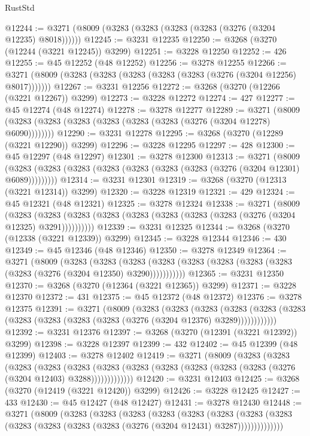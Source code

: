 \begin{lexlean}{RustStd}
\begin{coremodule}
@12244 := @3271 (@8009 (@3283 (@3283 (@3283 (@3283 (@3276 (@3204 @12235) @8018))))))
@12245 := @3231 @12235
@12250 := @3268 (@3270 (@12244 (@3221 @12245)) @3299)
@12251 := @3228 @12250
@12252 := 426
@12255 := @45 @12252 (@48 @12252)
@12256 := @3278 @12255
@12266 := @3271 (@8009 (@3283 (@3283 (@3283 (@3283 (@3283 (@3276 (@3204 @12256) @8017)))))))
@12267 := @3231 @12256
@12272 := @3268 (@3270 (@12266 (@3221 @12267)) @3299)
@12273 := @3228 @12272
@12274 := 427
@12277 := @45 @12274 (@48 @12274)
@12278 := @3278 @12277
@12289 := @3271 (@8009 (@3283 (@3283 (@3283 (@3283 (@3283 (@3283 (@3276 (@3204 @12278) @6090))))))))
@12290 := @3231 @12278
@12295 := @3268 (@3270 (@12289 (@3221 @12290)) @3299)
@12296 := @3228 @12295
@12297 := 428
@12300 := @45 @12297 (@48 @12297)
@12301 := @3278 @12300
@12313 := @3271
    (@8009 (@3283 (@3283 (@3283 (@3283 (@3283 (@3283 (@3283 (@3276 (@3204 @12301) @6089)))))))))
@12314 := @3231 @12301
@12319 := @3268 (@3270 (@12313 (@3221 @12314)) @3299)
@12320 := @3228 @12319
@12321 := 429
@12324 := @45 @12321 (@48 @12321)
@12325 := @3278 @12324
@12338 := @3271
    (@8009
      (@3283 (@3283 (@3283 (@3283 (@3283 (@3283 (@3283 (@3283 (@3276 (@3204 @12325) @3291))))))))))
@12339 := @3231 @12325
@12344 := @3268 (@3270 (@12338 (@3221 @12339)) @3299)
@12345 := @3228 @12344
@12346 := 430
@12349 := @45 @12346 (@48 @12346)
@12350 := @3278 @12349
@12364 := @3271
    (@8009
      (@3283
        (@3283
          (@3283 (@3283 (@3283 (@3283 (@3283 (@3283 (@3283 (@3276 (@3204 @12350) @3290)))))))))))
@12365 := @3231 @12350
@12370 := @3268 (@3270 (@12364 (@3221 @12365)) @3299)
@12371 := @3228 @12370
@12372 := 431
@12375 := @45 @12372 (@48 @12372)
@12376 := @3278 @12375
@12391 := @3271
    (@8009
      (@3283
        (@3283
          (@3283
            (@3283 (@3283 (@3283 (@3283 (@3283 (@3283 (@3283 (@3276 (@3204 @12376) @3289))))))))))))
@12392 := @3231 @12376
@12397 := @3268 (@3270 (@12391 (@3221 @12392)) @3299)
@12398 := @3228 @12397
@12399 := 432
@12402 := @45 @12399 (@48 @12399)
@12403 := @3278 @12402
@12419 := @3271
    (@8009
      (@3283
        (@3283
          (@3283
            (@3283
              (@3283
                (@3283 (@3283 (@3283 (@3283 (@3283 (@3283 (@3276 (@3204 @12403) @3288)))))))))))))
@12420 := @3231 @12403
@12425 := @3268 (@3270 (@12419 (@3221 @12420)) @3299)
@12426 := @3228 @12425
@12427 := 433
@12430 := @45 @12427 (@48 @12427)
@12431 := @3278 @12430
@12448 := @3271
    (@8009
      (@3283
        (@3283
          (@3283
            (@3283
              (@3283
                (@3283
                  (@3283
                    (@3283 (@3283 (@3283 (@3283 (@3283 (@3276 (@3204 @12431) @3287))))))))))))))

\end{coremodule}
\end{lexlean}
